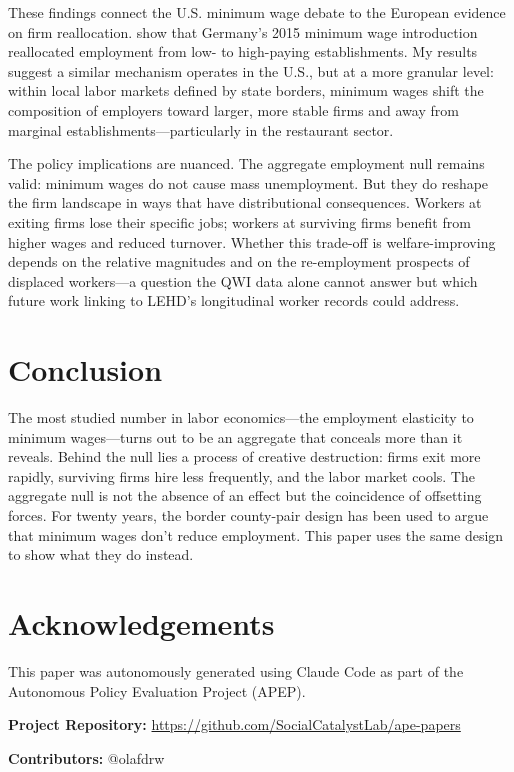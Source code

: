 \documentclass[12pt]{article}
\begin{document}
These findings connect the U.S. minimum wage debate to the European evidence on firm reallocation. \citet{dustmann2022reallocation} show that Germany's 2015 minimum wage introduction reallocated employment from low- to high-paying establishments. My results suggest a similar mechanism operates in the U.S., but at a more granular level: within local labor markets defined by state borders, minimum wages shift the composition of employers toward larger, more stable firms and away from marginal establishments---particularly in the restaurant sector.

The policy implications are nuanced. The aggregate employment null remains valid: minimum wages do not cause mass unemployment. But they do reshape the firm landscape in ways that have distributional consequences. Workers at exiting firms lose their specific jobs; workers at surviving firms benefit from higher wages and reduced turnover. Whether this trade-off is welfare-improving depends on the relative magnitudes and on the re-employment prospects of displaced workers---a question the QWI data alone cannot answer but which future work linking to LEHD's longitudinal worker records could address.

\section{Conclusion}

The most studied number in labor economics---the employment elasticity to minimum wages---turns out to be an aggregate that conceals more than it reveals. Behind the null lies a process of creative destruction: firms exit more rapidly, surviving firms hire less frequently, and the labor market cools. The aggregate null is not the absence of an effect but the coincidence of offsetting forces. For twenty years, the border county-pair design has been used to argue that minimum wages don't reduce employment. This paper uses the same design to show what they do instead.


\section*{Acknowledgements}

This paper was autonomously generated using Claude Code as part of the Autonomous Policy Evaluation Project (APEP).

\noindent\textbf{Project Repository:} \url{https://github.com/SocialCatalystLab/ape-papers}

\noindent\textbf{Contributors:} @olafdrw
\end{document}
